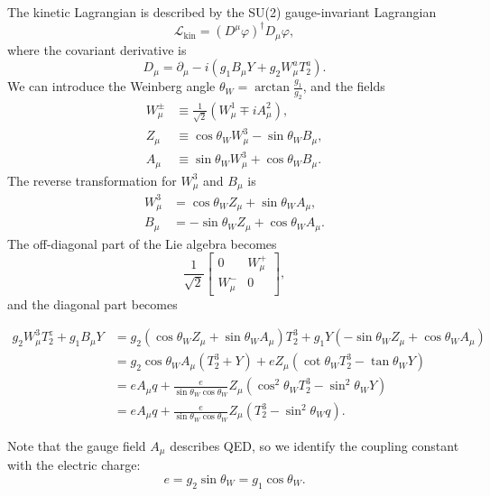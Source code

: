 \documentclass[aps,rmp,twocolumn,superscriptaddress,nofootinbib]{revtex4-2}
\begin{document}
The kinetic Lagrangian is described by the SU(2) gauge-invariant Lagrangian
\begin{equation}
	\mathcal L_{\mathrm{kin}} = (D^\mu \varphi)^\dagger D_\mu \varphi,
\end{equation}
where the covariant derivative is
\begin{equation}
	D_\mu = \partial_\mu -i \left(g_1 B_\mu Y + g_2 W^a_\mu T_2^a\right).
\end{equation}
We can introduce the Weinberg angle $\theta_W = \arctan\frac{g_1}{g_2}$, and the fields
\begin{equation}
\begin{aligned}
	W_\mu^\pm &\equiv \frac{1}{\sqrt 2}(W^1_\mu \mp i A_\mu^2), \\
	Z_\mu &\equiv \cos{\theta_W} W^3_\mu - \sin{\theta_W} B_\mu, \\
	A_\mu &\equiv \sin{\theta_W} W_\mu^3 + \cos{\theta_W} B_\mu.
\end{aligned}
\end{equation}
The reverse transformation for $W_\mu^3$ and $B_\mu$ is
\begin{equation}
\begin{aligned}
	W_\mu^3 &= \cos{\theta_W} Z_\mu + \sin{\theta_W} A_\mu, \\
	B_\mu &= -\sin{\theta_W} Z_\mu +\cos{\theta_W} A_\mu.
\end{aligned}
\end{equation}
The off-diagonal part of the Lie algebra becomes
\begin{equation}
	\frac{1}{\sqrt 2}\begin{bmatrix}
		0 &  W^+_\mu \\
		W_\mu^- & 0
	\end{bmatrix},
\end{equation}
and the diagonal part becomes
\begin{widetext}
\begin{equation}
\begin{aligned}
	g_2 W_\mu^3 T^z_2 + g_1 B_\mu Y
	&= g_2 (\cos{\theta_W} Z_\mu + \sin{\theta_W} A_\mu) T^3_2 + g_1 Y (-\sin{\theta_W} Z_\mu +\cos{\theta_W} A_\mu) \\
	&= g_2 \cos{\theta_W} A_\mu \left(T^3_2 + Y\right) + eZ_\mu \left(\cot{\theta_W}T_2^3 - \tan{\theta_W}Y \right) \\
	&= e A_\mu q + \frac{e}{\sin{\theta_W}\cos{\theta_W}} Z_\mu \left(\cos^2{\theta_W}T_2^3 - \sin^2{\theta_W} Y\right) \\
	&= e A_\mu q + \frac{e}{\sin{\theta_W}\cos{\theta_W}} Z_\mu \left(T_2^3 - \sin^2{\theta_W} q\right).
\end{aligned}
\end{equation}
\end{widetext}
Note that the gauge field $A_\mu$ describes QED, so we identify the coupling constant with the electric charge:
\begin{equation}
	e = g_2 \sin{\theta_W} = g_1 \cos{\theta_W}.
\end{equation}
\end{document}
